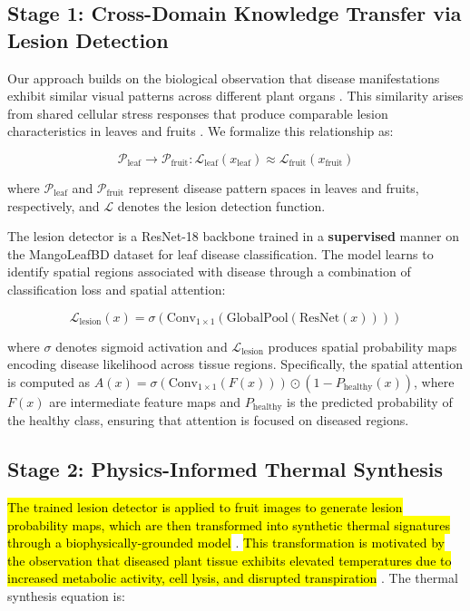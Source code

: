 \documentclass[utf8]{FrontiersinHarvard}
\newenvironment{revblock}{}{}
\begin{document}
\subsection{Stage 1: Cross-Domain Knowledge Transfer via Lesion Detection}
Our approach builds on the biological observation that disease manifestations exhibit similar visual patterns across different plant organs \cite{bock2010}. This similarity arises from shared cellular stress responses that produce comparable lesion characteristics in leaves and fruits \cite{savary2019}. We formalize this relationship as:

\begin{equation}
    \mathcal{P}_{\text{leaf}} \rightarrow \mathcal{P}_{\text{fruit}} : \mathcal{L}_{\text{leaf}}(x_{\text{leaf}}) \approx \mathcal{L}_{\text{fruit}}(x_{\text{fruit}})
    \label{eq:cross_domain}
\end{equation}

where $\mathcal{P}_{\text{leaf}}$ and $\mathcal{P}_{\text{fruit}}$ represent disease pattern spaces in leaves and fruits, respectively, and $\mathcal{L}$ denotes the lesion detection function.

\begin{revblock}
The lesion detector is a ResNet-18 \cite{he2016} backbone trained in a \textbf{supervised} manner on the MangoLeafBD dataset for leaf disease classification. The model learns to identify spatial regions associated with disease through a combination of classification loss and spatial attention:
\end{revblock}

\begin{equation}
    \mathcal{L}_{\text{lesion}}(x) = \sigma(\text{Conv}_{1\times 1}(\text{GlobalPool}(\text{ResNet}(x))))
    \label{eq:lesion_detector}
\end{equation}

where $\sigma$ denotes sigmoid activation and $\mathcal{L}_{\text{lesion}}$ produces spatial probability maps encoding disease likelihood across tissue regions. \begin{revblock}Specifically, the spatial attention is computed as $A(x) = \sigma(\text{Conv}_{1 \times 1}(F(x))) \odot (1 - P_{\text{healthy}}(x))$, where $F(x)$ are intermediate feature maps and $P_{\text{healthy}}$ is the predicted probability of the healthy class, ensuring that attention is focused on diseased regions.\end{revblock}

\subsection{Stage 2: Physics-Informed Thermal Synthesis}
\hl{The trained lesion detector is applied to fruit images to generate lesion probability maps, which are then transformed into synthetic thermal signatures through a biophysically-grounded model} \cite{raissi2019,karniadakis2021}. \hl{This transformation is motivated by the observation that diseased plant tissue exhibits elevated temperatures due to increased metabolic activity, cell lysis, and disrupted transpiration} \cite{mahlein2016,pineda2021}. The thermal synthesis equation is:
\end{document}
